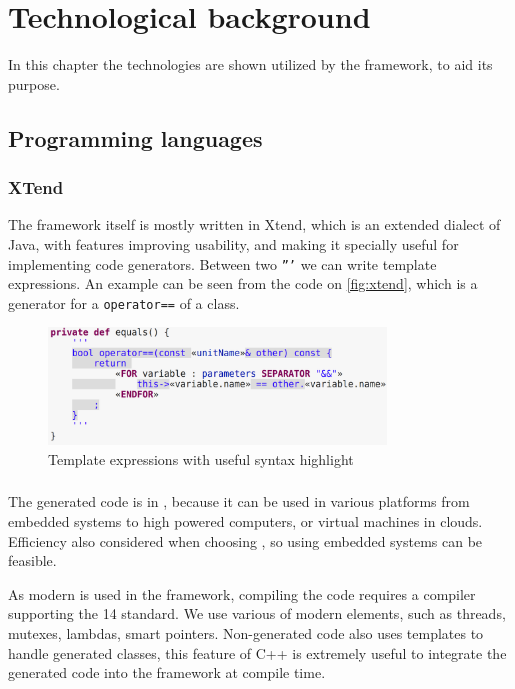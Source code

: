 \chapter{Technological background}

In this chapter the technologies are shown utilized by the framework, to aid its purpose.

\section{Programming languages}


\subsection{XTend}
The framework itself is mostly written in Xtend\cite{xtend}, which is an extended dialect of Java, with features improving usability, and making it specially useful for implementing code generators. 
Between two \texttt{'''} we can write template expressions.
An example can be seen from the code on \autoref{fig:xtend}, which is a generator for a \cpp{} \texttt{operator==} of a class. 

\begin{figure}[H]
	\begin{center}
		\includegraphics[width=0.8\textwidth]{figures/xtend.png}
		\caption{Template expressions with useful syntax highlight }
		\label{fig:xtend}
	\end{center}
\end{figure}


\subsection{\protect\cpptt }
The generated code is in \cpp{}, because it can be used in various platforms from embedded systems to high powered computers, or virtual machines in clouds. 
Efficiency also considered when choosing \cpp{}, so using embedded systems can be feasible. 

As modern \cpp{} is used in the framework, compiling the code requires a compiler supporting the \cpp{}14 standard.
We use various of modern \cpp{} elements, such as threads, mutexes, lambdas, smart pointers.
Non-generated code also uses templates to handle generated classes, this feature of C++ is extremely useful to integrate the generated code into the framework at compile time.

